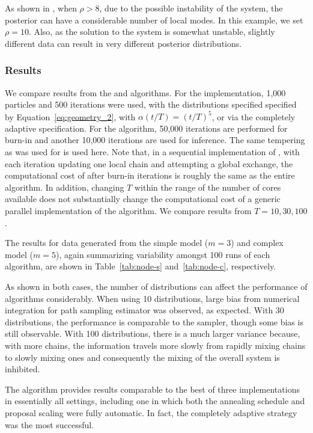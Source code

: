 As shown in \cite{Calderhead:2009bd}, when $\rho > 8$, due to the possible
instability of the \ode system, the posterior can have a considerable number
of local modes. In this example, we set $\rho = 10$. Also, as the solution to
the \ode system is somewhat unstable, slightly different data can result in
very different posterior distributions.

\subsubsection{Results}

We compare results from the \smc[2] and \pmcmc algorithms. For the \smc
implementation, 1,000 particles and 500 iterations were used, with the
distributions specified specified by Equation~\eqref{eq:geometry_2}, with
$\alpha(t/T) = (t/T)^5$, or via the completely adaptive specification. For
the \pmcmc algorithm, 50,000 iterations are performed for burn-in and another
10,000 iterations are used for inference. The same tempering as was used for
\smc is used here. Note that, in a sequential implementation of \pmcmc, with
each iteration updating one local chain and attempting a global exchange, the
computational cost of after burn-in iterations is roughly the same as the
entire \smc algorithm. In addition, changing $T$ within the range of the
number of cores available does not substantially change the computational cost
of a generic parallel implementation of the \pmcmc algorithm. We compare
results from $T = 10,30,100$.

The results for data generated from the simple model ($m = 3$) and complex
model ($m = 5$), again summarizing variability amongst 100 runs of each
algorithm, are shown in Table~\ref{tab:node-s} and~\ref{tab:node-c},
respectively.




As shown in both cases, the number of distributions can affect the performance
of \pmcmc algorithms considerably. When using 10 distributions, large bias
from numerical integration for path sampling estimator was observed, as
expected. With 30 distributions, the performance is comparable to the \smc[2]
sampler, though some bias is still observable. With 100 distributions, there
is a much larger variance because, with more chains, the information travels
more slowly from rapidly mixing chains to slowly mixing ones and consequently
the mixing of the overall system is inhibited.

The \smc algorithm provides results comparable to the best of
three \pmcmc implementations in essentially all settings, including one in
which both the annealing schedule and proposal scaling were fully
automatic. In fact, the completely adaptive strategy was the most successful.

